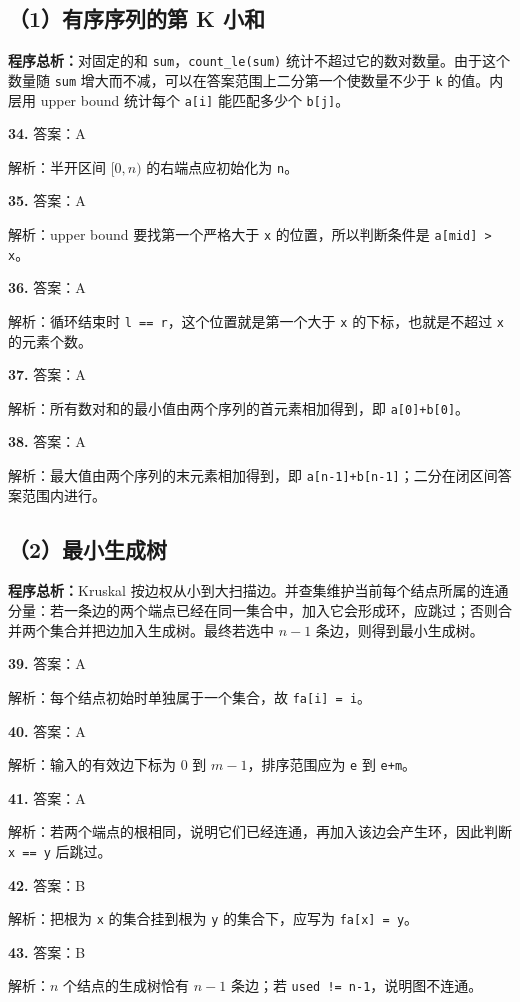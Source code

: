 \documentclass[a4paper]{ctexart}
\newcommand{\ans}[2]{\noindent\textbf{#1} \quad 答案：#2\par}
\newcommand{\expn}[1]{\hspace*{1.5em} 解析：#1\par}
\newcommand{\overview}[1]{\par\smallskip\noindent\textbf{程序总析：}#1\par\smallskip}
\begin{document}
\subsection*{（1）有序序列的第 K 小和}
\overview{对固定的和 \texttt{sum}，\texttt{count\_le(sum)} 统计不超过它的数对数量。由于这个数量随 \texttt{sum} 增大而不减，可以在答案范围上二分第一个使数量不少于 \texttt{k} 的值。内层用 upper bound 统计每个 \texttt{a[i]} 能匹配多少个 \texttt{b[j]}。}
\begin{center}
\end{center}
\ans{34.}{A}\expn{半开区间 $[0,n)$ 的右端点应初始化为 \texttt{n}。}
\ans{35.}{A}\expn{upper bound 要找第一个严格大于 \texttt{x} 的位置，所以判断条件是 \texttt{a[mid] > x}。}
\ans{36.}{A}\expn{循环结束时 \texttt{l == r}，这个位置就是第一个大于 \texttt{x} 的下标，也就是不超过 \texttt{x} 的元素个数。}
\ans{37.}{A}\expn{所有数对和的最小值由两个序列的首元素相加得到，即 \texttt{a[0]+b[0]}。}
\ans{38.}{A}\expn{最大值由两个序列的末元素相加得到，即 \texttt{a[n-1]+b[n-1]}；二分在闭区间答案范围内进行。}

\subsection*{（2）最小生成树}
\overview{Kruskal 按边权从小到大扫描边。并查集维护当前每个结点所属的连通分量：若一条边的两个端点已经在同一集合中，加入它会形成环，应跳过；否则合并两个集合并把边加入生成树。最终若选中 $n-1$ 条边，则得到最小生成树。}
\begin{center}
\end{center}
\ans{39.}{A}\expn{每个结点初始时单独属于一个集合，故 \texttt{fa[i] = i}。}
\ans{40.}{A}\expn{输入的有效边下标为 $0$ 到 $m-1$，排序范围应为 \texttt{e} 到 \texttt{e+m}。}
\ans{41.}{A}\expn{若两个端点的根相同，说明它们已经连通，再加入该边会产生环，因此判断 \texttt{x == y} 后跳过。}
\ans{42.}{B}\expn{把根为 \texttt{x} 的集合挂到根为 \texttt{y} 的集合下，应写为 \texttt{fa[x] = y}。}
\ans{43.}{B}\expn{$n$ 个结点的生成树恰有 $n-1$ 条边；若 \texttt{used != n-1}，说明图不连通。}
\end{document}
